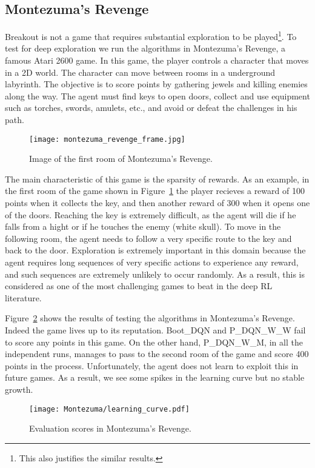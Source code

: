 \subsection{Montezuma's Revenge}
Breakout is not a game that requires substantial exploration to be played\footnote{This also justifies the similar results.}. To test for deep exploration we run the algorithms in Montezuma's Revenge, a famous Atari 2600 game. In this game, the player controls a character that moves in a 2D world. The character can move between rooms in a underground labyrinth. The objective is to score points by gathering jewels and killing enemies along the way. The agent must find keys to open doors, collect and use equipment such as torches, swords, amulets, etc., and avoid or defeat the challenges in his path.\par
\begin{figure}[H]
 \centering \texttt{[image: montezuma\_revenge\_frame.jpg]}
 \caption{Image of the first room of Montezuma's Revenge.}
 \label{fig:montezuma_frame}
\end{figure}
The main characteristic of this game is the sparsity of rewards. As an example, in the first room of the game shown in Figure~\ref{fig:montezuma_frame} the player recieves a reward of 100 points when it collects the key, and then another reward of 300 when it opens one of the doors. Reaching the key is extremely difficult, as the agent will die if he falls from a hight or if he touches the enemy (white skull). To move in the following room, the agent needs to follow a very specific route to the key and back to the door. Exploration is extremely important in this domain because the agent requires long sequences of very specific actions to experience any reward, and such sequences are extremely unlikely to occur randomly. As a result, this is considered as one of the most challenging games to beat in the deep RL literature.\par
Figure~\ref{fig:montezuma_learning_curve} shows the results of testing the algorithms in Montezuma's Revenge. Indeed the game lives up to its reputation. Boot\_DQN and P\_DQN\_W\_W fail to score any points in this game. On the other hand, P\_DQN\_W\_M, in all the independent runs, manages to pass to the second room of the game and score 400 points in the process. Unfortunately, the agent does not learn to exploit this in future games. As a result, we see some spikes in the learning curve but no stable growth.
\begin{figure}[H]
 \centering \texttt{[image: Montezuma/learning\_curve.pdf]}
 \caption{Evaluation scores in Montezuma's Revenge.}
 \label{fig:montezuma_learning_curve}
\end{figure}